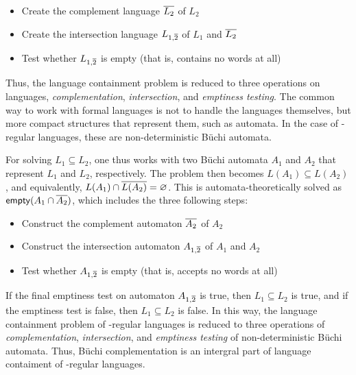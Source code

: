 \begin{itemize}
\item Create the complement language $\cl1{L_2}$ of $L_2$
\item Create the intersection language $L_{1,\cl1{2}}$ of $L_1$ and $\cl1{L_2}$
\item Test whether $L_{1,\cl1{2}}$ is empty (that is, contains no words at all)
\end{itemize}

Thus, the language containment problem is reduced to three operations on languages, \textit{complementation}, \textit{intersection}, and \textit{emptiness testing}. The common way to work with formal languages is not to handle the languages themselves, but more compact structures that represent them, such as automata. In the case of \om-regular languages, these are non-deterministic Büchi automata.

For solving $L_1 \subseteq L_2$, one thus works with two Büchi automata $A_1$ and $A_2$ that represent $L_1$ and $L_2$, respectively. The problem then becomes $L(A_1) \subseteq L(A_2)$, and equivalently, $L(A_1) \cap \cl1{L(A_2)} = \varnothing$. This is automata-theoretically solved as $\text{\textsf{empty}}(A_1 \cap \cl1{A_2})$, which includes the three following steps:

\begin{itemize}
\item Construct the complement automaton $\cl1{A_2}$ of $A_2$
\item Construct the intersection automaton $A_{1,\cl1{2}}$ of $A_1$ and $A_2$
\item Test whether $A_{1,\cl1{2}}$ is empty (that is, accepts no words at all)
\end{itemize}

If the final emptiness test on automaton $A_{1,\cl1{2}}$ is true, then $L_1 \subseteq L_2$ is true, and if the emptiness test is false, then $L_1 \subseteq L_2$ is false. In this way, the language containment problem of \om-regular languages is reduced to three operations of \textit{complementation}, \textit{intersection}, and \textit{emptiness testing} of non-deterministic Büchi automata. Thus, Büchi complementation is an intergral part of language contaiment of \om-regular languages.


